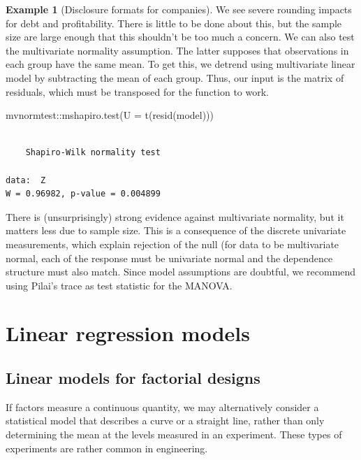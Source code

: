 \documentclass[
  11pt,
  letterpaper,
]{scrbook}
\newenvironment{Shaded}{\begin{snugshade}}{\end{snugshade}}
\newcommand{\AttributeTok}[1]{\textcolor[rgb]{0.40,0.45,0.13}{#1}}
\newcommand{\FunctionTok}[1]{\textcolor[rgb]{0.28,0.35,0.67}{#1}}
\newcommand{\NormalTok}[1]{\textcolor[rgb]{0.00,0.23,0.31}{#1}}
\newcommand{\SpecialCharTok}[1]{\textcolor[rgb]{0.37,0.37,0.37}{#1}}
\theoremstyle{definition}
\theoremstyle{definition}
\newtheorem{example}{Example}[chapter]
\theoremstyle{remark}
\begin{document}
\begin{example}[Disclosure formats for
companies]
We see severe rounding impacts for debt and profitability. There is
little to be done about this, but the sample size are large enough that
this shouldn't be too much a concern. We can also test the multivariate
normality assumption. The latter supposes that observations in each
group have the same mean. To get this, we detrend using multivariate
linear model by subtracting the mean of each group. Thus, our input is
the matrix of residuals, which must be transposed for the function to
work.

\begin{Shaded}
\begin{Highlighting}[]
\NormalTok{mvnormtest}\SpecialCharTok{::}\FunctionTok{mshapiro.test}\NormalTok{(}\AttributeTok{U =} \FunctionTok{t}\NormalTok{(}\FunctionTok{resid}\NormalTok{(model)))}
\end{Highlighting}
\end{Shaded}

\begin{verbatim}

    Shapiro-Wilk normality test

data:  Z
W = 0.96982, p-value = 0.004899
\end{verbatim}

There is (unsurprisingly) strong evidence against multivariate
normality, but it matters less due to sample size. This is a consequence
of the discrete univariate measurements, which explain rejection of the
null (for data to be multivariate normal, each of the response must be
univariate normal and the dependence structure must also match. Since
model assumptions are doubtful, we recommend using Pilai's trace as test
statistic for the MANOVA.

\end{example}


\chapter{Linear regression models}\label{linear-regression-models}

\section{Linear models for factorial
designs}\label{linear-models-for-factorial-designs}

If factors measure a continuous quantity, we may alternatively consider
a statistical model that describes a curve or a straight line, rather
than only determining the mean at the levels measured in an experiment.
These types of experiments are rather common in engineering.
\end{document}

